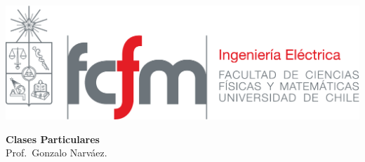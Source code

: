 \documentclass[
  11pt,
  letterpaper,
  answers
]{exam}
\begin{document}
\begin{minipage}{0.42\textwidth}
    \includegraphics[width=\textwidth]{../fcfm_die}
\end{minipage}
\begin{minipage}{0.53\textwidth}
\begin{center} 
\large\textbf{Clases Particulares} \\
\normalsize Prof.~Gonzalo Narváez.
\end{center}
\end{minipage}
\end{document}
